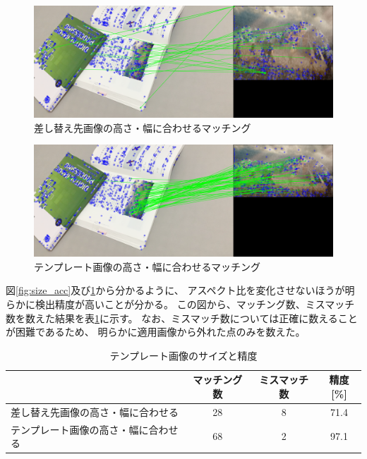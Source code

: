 \begin{figure}[h]
    \centering
    \includegraphics[width=1\linewidth]{fig/matches_SIFT_difference.png}
    \caption{差し替え先画像の高さ・幅に合わせるマッチング}
    \label{fig:size_acc_diff}
\end{figure}

\begin{figure}[h]
    \centering
    \includegraphics[width=1\linewidth]{fig/matches_SIFT_same.png}
    \caption{テンプレート画像の高さ・幅に合わせるマッチング}
    \label{fig:size_acc_same}
\end{figure}

図\ref{fig:size_acc}及び\ref{fig:size_acc_diff}から分かるように、
アスペクト比を変化させないほうが明らかに検出精度が高いことが分かる。
この図から、マッチング数、ミスマッチ数を数えた結果を表\ref{tb:size_acc}に示す。
なお、ミスマッチ数については正確に数えることが困難であるため、
明らかに適用画像から外れた点のみを数えた。

\begin{table}[h]
    \centering
    \caption{テンプレート画像のサイズと精度}
    \label{tb:size_acc}
    \begin{tabular}{lccc} \hline \hline
         & マッチング数 & ミスマッチ数 & 精度[\%]\\ \hline
        差し替え先画像の高さ・幅に合わせる & 28 & 8 & 71.4 \\
        テンプレート画像の高さ・幅に合わせる & 68 & 2 & 97.1 \\ \hline
    \end{tabular}
\end{table}

